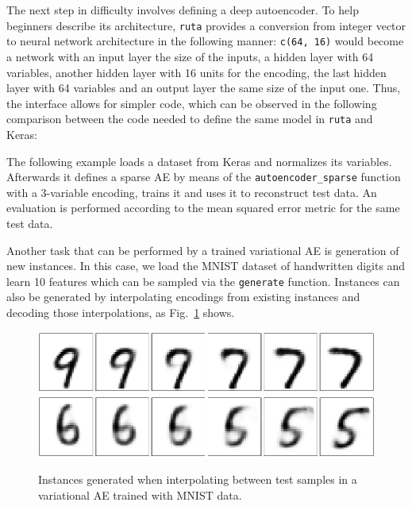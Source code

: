 {The next step in difficulty involves defining a deep autoencoder. To help beginners describe its architecture, \texttt{ruta} provides a conversion from integer vector to neural network architecture in the following manner: \texttt{c(64, 16)} would become a network with an input layer the size of the inputs, a hidden layer with 64 variables, another hidden layer with 16 units for the encoding, the last hidden layer with 64 variables and an output layer the same size of the input one. Thus, the interface allows for simpler code, which can be observed in the following comparison between the code needed to define the same model in \texttt{ruta} and Keras:
}



The following example loads a dataset from Keras and normalizes its variables. Afterwards it defines a sparse AE by means of the \texttt{autoencoder\_sparse} function with a 3-variable encoding, trains it and uses it to reconstruct test data. An evaluation is performed according to the mean squared error metric for the same test data.



Another task that can be performed by a trained variational AE is generation of new instances. In this case, we load the MNIST dataset of handwritten digits and learn 10 features which can be sampled via the \texttt{generate} function. Instances can also be generated by interpolating encodings from existing instances and decoding those interpolations, as Fig.~\ref{p2fig.variational} shows.




\begin{figure}[ht]
  \centering
  \includegraphics[width=0.8\columnwidth]{variational_97.pdf}
  \includegraphics[width=0.8\columnwidth]{variational_65.pdf}
  \caption{Instances generated when interpolating between test samples in a variational AE trained with MNIST data.}
  \label{p2fig.variational}
\end{figure}

